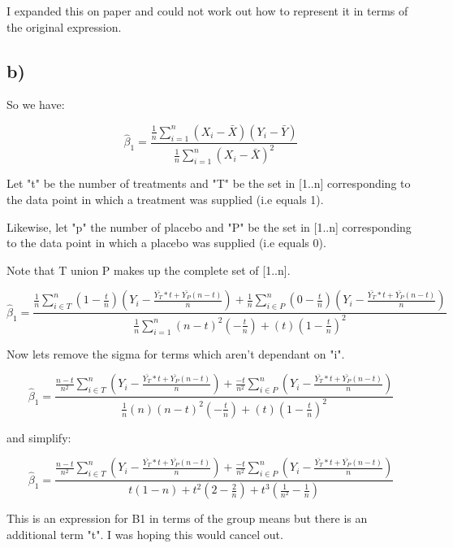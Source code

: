 \documentclass{article}
\newcommand\sumlrg{\frac{1}{n}\sum_{i=1}^{n}(}
\newcommand\expandedlrg{\hat{\beta}_{1} = \frac{\sumlrg{}X_{i} - \bar{X})(Y_{i} - \bar{Y})}{\sumlrg{}X_{i} - \bar{X})^2}}
\begin{document}
I expanded this on paper and could not work out how to represent it in terms of the original expression.

\subsection*{b)}

So we have:

\begin{equation*}
	\expandedlrg{}
\end{equation*}

Let "t" be the number of treatments and "T" be the set in [1..n] corresponding to the data point in which a treatment was supplied (i.e equals 1).

Likewise, let "p" the number of placebo and "P" be the set in [1..n] corresponding to the data point in which a placebo was supplied (i.e equals 0).

Note that T union P makes up the complete set of [1..n].

\begin{equation*}
	\hat{\beta}_{1} = 
		\frac{
			\frac{1}{n}\sum_{i\in{T}}^{n}(1-\frac{t}{n})(Y_{i} - \frac{\bar{Y_T}*t+\bar{Y_P}(n-t)}{n})+
			\frac{1}{n}\sum_{i\in{P}}^{n}(0-\frac{t}{n})(Y_{i} - \frac{\bar{Y_T}*t+\bar{Y_P}(n-t)}{n})
		}{
			\frac{1}{n}\sum_{i=1}^{n}(n-t)^2(-\frac{t}{n})+
			(t)(1-\frac{t}{n})^2
		}
\end{equation*}
\newpage

Now lets remove the sigma for terms which aren't dependant on "i".

\begin{equation*}
	\hat{\beta}_{1} = 
		\frac{
			\frac{n-t}{n^2}\sum_{i\in{T}}^{n}(Y_{i} - \frac{\bar{Y_T}*t+\bar{Y_P}(n-t)}{n})+
			\frac{-t}{n^2}\sum_{i\in{P}}^{n}(Y_{i} - \frac{\bar{Y_T}*t+\bar{Y_P}(n-t)}{n})
		}{
			\frac{1}{n}(n)(n-t)^2(-\frac{t}{n})+
			(t)(1-\frac{t}{n})^2
		}
\end{equation*}

and simplify:

\begin{equation*}
	\hat{\beta}_{1} = 
		\frac{
			\frac{n-t}{n^2}\sum_{i\in{T}}^{n}(Y_{i} - \frac{\bar{Y_T}*t+\bar{Y_P}(n-t)}{n})+
			\frac{-t}{n^2}\sum_{i\in{P}}^{n}(Y_{i} - \frac{\bar{Y_T}*t+\bar{Y_P}(n-t)}{n})
		}{
			t(1-n) + t^2(2-\frac{2}{n}) + t^3(\frac{1}{n^2}-\frac{1}{n})
		}
\end{equation*}

This is an expression for B1 in terms of the group means but there is an additional term "t". I was hoping this would cancel out.
\end{document}
